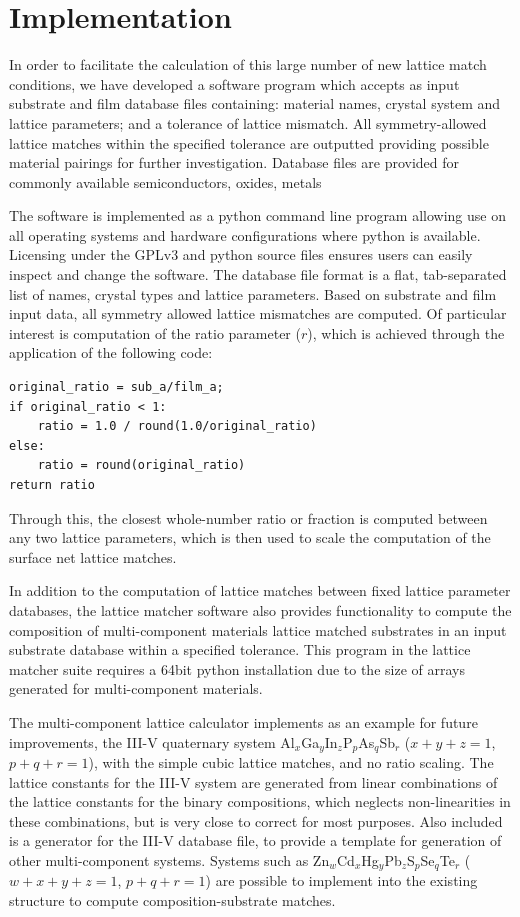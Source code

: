 \documentclass[final,5p,times,twocolumn]{elsarticle}
\begin{document}
\section{Implementation}
In order to facilitate the calculation of this large number of new lattice match conditions, we have developed a software program which accepts as input substrate and film database files containing: material names, crystal system and lattice parameters; and a tolerance of lattice mismatch. All symmetry-allowed lattice matches within the specified tolerance are outputted providing possible material pairings for further investigation. Database files are provided for commonly available semiconductors, oxides, metals

The software is implemented as a python command line program allowing use on all operating systems and hardware configurations where python is available. Licensing under the GPLv3 and python source files ensures users can easily inspect and change the software. The database file format is a flat, tab-separated list of names, crystal types and lattice parameters. Based on substrate and film input data, all symmetry allowed lattice mismatches are computed. Of particular interest is computation of the ratio parameter ($r$), which is achieved through the application of the following code:
\begin{verbatim}
original_ratio = sub_a/film_a;
if original_ratio < 1:
    ratio = 1.0 / round(1.0/original_ratio)
else:
    ratio = round(original_ratio)
return ratio
\end{verbatim}
Through this, the closest whole-number ratio or fraction is computed between any two lattice parameters, which is then used to scale the computation of the surface net lattice matches.

In addition to the computation of lattice matches between fixed lattice parameter databases, the lattice matcher software also provides functionality to compute the composition of multi-component materials lattice matched substrates in an input substrate database within a specified tolerance. This program in the lattice matcher suite requires a 64bit python installation due to the size of arrays generated for multi-component materials.

The multi-component lattice calculator implements as an example for future improvements, the III-V quaternary system Al$_x$Ga$_y$In$_z$P$_p$As$_q$Sb$_r$ ($x+y+z=1$, $p+q+r=1$), with the simple cubic lattice matches, and no ratio scaling. The lattice constants for the III-V system are generated from linear combinations of the lattice constants for the binary compositions\cite{Ahrenkiel2012}, which neglects non-linearities in these combinations, but is very close to correct for most purposes\cite{Moon1974,Adachi1982}. Also included is a generator for the III-V database file, to provide a template for generation of other multi-component systems. Systems such as Zn$_w$Cd$_x$Hg$_y$Pb$_z$S$_p$Se$_q$Te$_r$ ($w+x+y+z=1$, $p+q+r=1$)  are possible to implement into the existing structure to compute composition-substrate matches.
\end{document}

